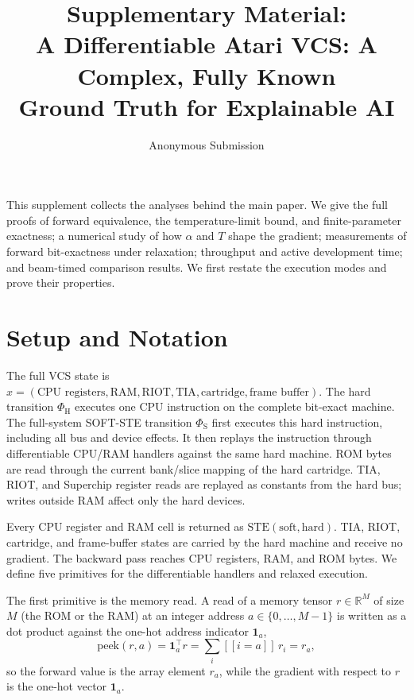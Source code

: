 \documentclass[letterpaper]{article} %
\title{Supplementary Material:\\
A Differentiable Atari VCS: A Complex, Fully Known\\
Ground Truth for Explainable AI}
\author{Anonymous Submission}
\begin{document}
\maketitle

This supplement collects the analyses behind the main paper. We give
the full proofs of forward equivalence, the temperature-limit bound,
and finite-parameter exactness; a numerical study of how $\alpha$
and $T$ shape the gradient; measurements of forward bit-exactness
under relaxation; throughput and active development time; and
beam-timed comparison results. We first restate the execution
modes and prove their properties.

\section{Setup and Notation}

The full VCS state is
$x=(\text{CPU registers},\text{RAM},\text{RIOT},\text{TIA},
\text{cartridge},\text{frame buffer})$.
The hard transition $\Phi_{\mathrm{H}}$ executes one CPU instruction
on the complete bit-exact machine. The full-system SOFT-STE
transition $\Phi_{\mathrm{S}}$ first executes this hard instruction,
including all bus and device effects. It then replays the instruction
through differentiable CPU/RAM handlers against the same hard machine.
ROM bytes are read through the current bank/slice mapping of the
hard cartridge. TIA, RIOT, and Superchip register reads are
replayed as constants from the hard bus; writes outside RAM
affect only the hard devices.

Every CPU register and RAM cell is returned as
$\mathrm{STE}(\text{soft},\text{hard})$. TIA, RIOT, cartridge,
and frame-buffer states are carried by the hard machine and
receive no gradient. The backward pass reaches CPU registers,
RAM, and ROM bytes. We define five primitives for the
differentiable handlers and relaxed execution.

The first primitive is the memory read. A read of a memory tensor
$r\in\mathbb{R}^{M}$ of size $M$ (the ROM or the RAM) at an integer address
$a\in\{0,\dots,M-1\}$ is written as a dot product against the one-hot address
indicator $\mathbf{1}_a$,
\begin{equation}
\mathrm{peek}(r,a)=\mathbf{1}_a^{\top}r=\textstyle\sum_i[\![i=a]\!]\,r_i=r_a ,
\label{eq:s-peek}
\end{equation}
so the forward value is the array element $r_a$, while the gradient with respect
to $r$ is the one-hot vector $\mathbf{1}_a$.
\end{document}
